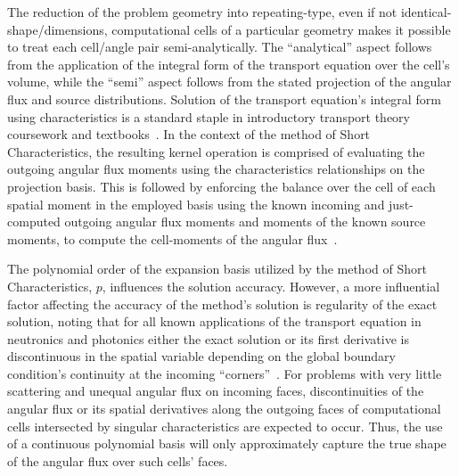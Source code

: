The reduction of the problem geometry into repeating-type, even if not identical-shape/dimensions, computational cells of a particular geometry makes it possible to treat each cell/angle pair semi-analytically.
The ``analytical'' aspect follows from the application of the integral form of the transport equation over the cell's volume, while the ``semi'' aspect follows from the stated projection of the angular flux and source distributions.
Solution of the transport equation's integral form using characteristics is a standard staple in introductory transport theory coursework and textbooks~\cite{Lewis1993}.
In the context of the method of Short Characteristics, the resulting kernel operation is comprised of evaluating the outgoing angular flux moments using the characteristics relationships on the projection basis.
This is followed by enforcing the balance over the cell of each spatial moment in the employed basis using the known incoming and just-computed outgoing angular flux moments and moments of the known source moments, to compute the cell-moments of the angular flux~\cite{Sanchez1982}.

The polynomial order of the expansion basis utilized by the method of Short Characteristics, $p$, influences the solution accuracy.
However, a more influential factor affecting the accuracy of the method's solution is regularity of the exact solution, noting that for all known applications of the transport equation in neutronics and photonics either the exact solution or its first derivative is discontinuous in the spatial variable depending on the global boundary condition's continuity at the incoming ``corners''~\cite{Duo2009}.
For problems with very little scattering and unequal angular flux on incoming faces, discontinuities of the angular flux or its spatial derivatives along the outgoing faces of computational cells intersected by singular characteristics are expected to occur.
Thus, the use of a continuous polynomial basis will only approximately capture the true shape of the angular flux over such cells' faces.

